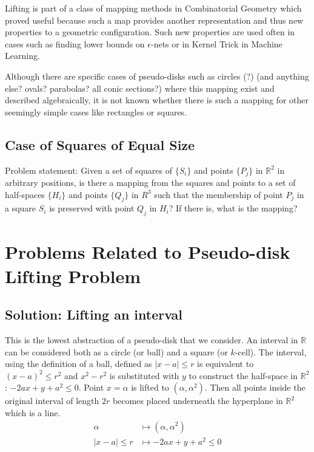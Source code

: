 \documentclass{NSF}
\begin{document}
Lifting is part of a class of mapping methods in Combinatorial Geometry which proved useful because such a map provides another representation and thus new properties to a geometric configuration. Such new properties are used often in cases such as finding lower bounds on $\epsilon$-nets or in Kernel Trick in Machine Learning. 

Although there are specific cases of pseudo-disks such as circles (?) (and anything else? ovals? parabolas? all conic sections?) where this mapping exist and described algebraically, it is not known whether there is such a mapping for other seemingly simple cases like rectangles or squares. 

\subsection{Case of Squares of Equal Size}
Problem statement: Given a set of squares of  $\{S_i\}$ and points $\{P_j\}$ in $\mathbb{R}^2$ in arbitrary positions, is there a mapping from the squares and points to a set of half-spaces $\{H_i\}$ and points $\{Q_j\}$ in $R^3$ such that the membership of point $P_j$ in a square $S_i$ is preserved with point $Q_j$ in $H_i$? If there is, what is the mapping? 

\section{Problems Related to Pseudo-disk Lifting Problem}
\subsection{Solution: Lifting an interval}
This is the lowest abstraction of a pseudo-disk that we consider. An interval in $\mathbb{R}$ can be considered both as a circle (or ball) and a square (or $k$-cell). The interval, using the definition of a ball, defined as $|x-a|\leq r$ is equivalent to $(x-a)^2 \leq r^2$ and $x^2-r^2$ is substituted with $y$ to construct the half-space in $\mathbb{R}^2$: $-2ax+y+a^2 \leq 0$.  Point $x=\alpha$ is lifted to $(\alpha, \alpha^2)$. Then all points inside the original interval of length $2r$ becomes placed underneath the hyperplane in $\mathbb{R}^2$ which is a line.
\begin{align*}
\alpha & \mapsto (\alpha,\alpha^2) \\
|x-a|\leq r & \mapsto -2ax + y + a^2 \leq 0
\end{align*}
\end{document}
